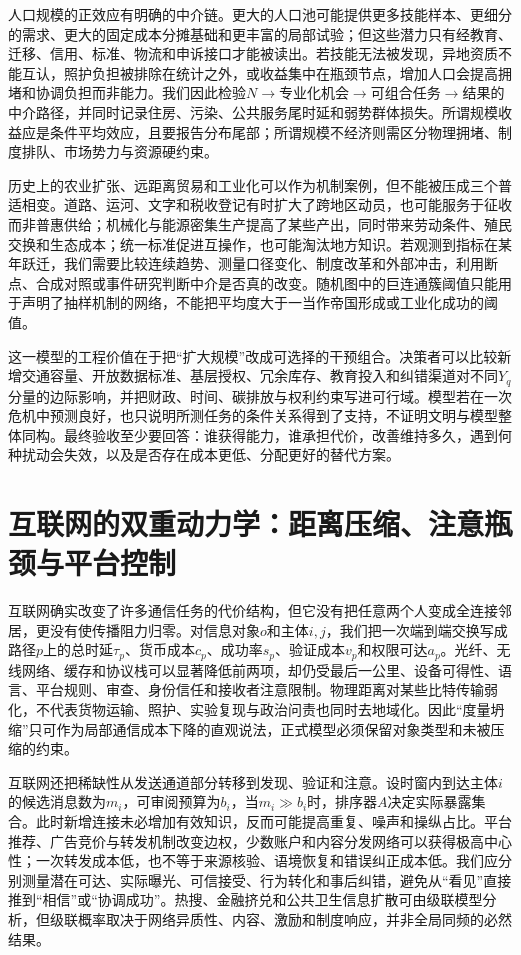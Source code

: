 人口规模的正效应有明确的中介链。更大的人口池可能提供更多技能样本、更细分的需求、更大的固定成本分摊基础和更丰富的局部试验；但这些潜力只有经教育、迁移、信用、标准、物流和申诉接口才能被读出。若技能无法被发现，异地资质不能互认，照护负担被排除在统计之外，或收益集中在瓶颈节点，增加人口会提高拥堵和协调负担而非能力。我们因此检验$N\rightarrow$专业化机会$\rightarrow$可组合任务$\rightarrow$结果的中介路径，并同时记录住房、污染、公共服务尾时延和弱势群体损失。所谓规模收益应是条件平均效应，且要报告分布尾部；所谓规模不经济则需区分物理拥堵、制度排队、市场势力与资源硬约束。

历史上的农业扩张、远距离贸易和工业化可以作为机制案例，但不能被压成三个普适相变。道路、运河、文字和税收登记有时扩大了跨地区动员，也可能服务于征收而非普惠供给；机械化与能源密集生产提高了某些产出，同时带来劳动条件、殖民交换和生态成本；统一标准促进互操作，也可能淘汰地方知识。若观测到指标在某年跃迁，我们需要比较连续趋势、测量口径变化、制度改革和外部冲击，利用断点、合成对照或事件研究判断中介是否真的改变。随机图中的巨连通簇阈值只能用于声明了抽样机制的网络，不能把平均度大于一当作帝国形成或工业化成功的阈值。

这一模型的工程价值在于把“扩大规模”改成可选择的干预组合。决策者可以比较新增交通容量、开放数据标准、基层授权、冗余库存、教育投入和纠错渠道对不同$Y_q$分量的边际影响，并把财政、时间、碳排放与权利约束写进可行域。模型若在一次危机中预测良好，也只说明所测任务的条件关系得到了支持，不证明文明与模型整体同构。最终验收至少要回答：谁获得能力，谁承担代价，改善维持多久，遇到何种扰动会失效，以及是否存在成本更低、分配更好的替代方案。

\section{互联网的双重动力学：距离压缩、注意瓶颈与平台控制}
\label{sec:internet_metric_collapse}

互联网确实改变了许多通信任务的代价结构，但它没有把任意两个人变成全连接邻居，更没有使传播阻力归零。对信息对象$o$和主体$i,j$，我们把一次端到端交换写成路径$p$上的总时延$\tau_p$、货币成本$c_p$、成功率$s_p$、验证成本$v_p$和权限可达$a_p$。光纤、无线网络、缓存和协议栈可以显著降低前两项，却仍受最后一公里、设备可得性、语言、平台规则、审查、身份信任和接收者注意限制。物理距离对某些比特传输弱化，不代表货物运输、照护、实验复现与政治问责也同时去地域化。因此“度量坍缩”只可作为局部通信成本下降的直观说法，正式模型必须保留对象类型和未被压缩的约束。

互联网还把稀缺性从发送通道部分转移到发现、验证和注意。设时窗内到达主体$i$的候选消息数为$m_i$，可审阅预算为$b_i$，当$m_i\gg b_i$时，排序器$A$决定实际暴露集合。此时新增连接未必增加有效知识，反而可能提高重复、噪声和操纵占比。平台推荐、广告竞价与转发机制改变边权，少数账户和内容分发网络可以获得极高中心性；一次转发成本低，也不等于来源核验、语境恢复和错误纠正成本低。我们应分别测量潜在可达、实际曝光、可信接受、行为转化和事后纠错，避免从“看见”直接推到“相信”或“协调成功”。热搜、金融挤兑和公共卫生信息扩散可由级联模型分析，但级联概率取决于网络异质性、内容、激励和制度响应，并非全局同频的必然结果。

